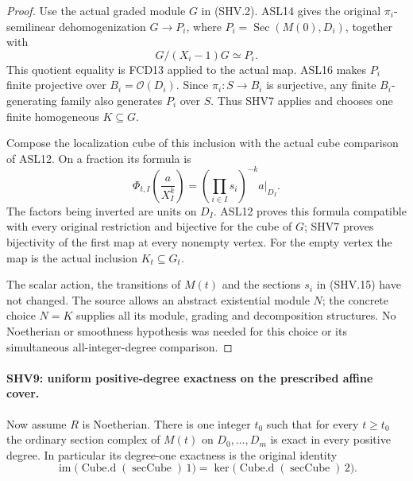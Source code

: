 \begin{proof}
Use the actual graded module $G$ in (SHV.2).
ASL14 gives the original $\pi_i$-semilinear dehomogenization
$G\to P_i$, where
$P_i=\operatorname{Sec}(M(0),D_i)$, together with
\[
                  G/(X_i-1)G\simeq P_i.                 \tag{SHV.14}
\]
This quotient equality is FCD13 applied to the actual map.
ASL16 makes $P_i$ finite projective over
$B_i=\mathcal O(D_i)$.  Since $\pi_i:S\to B_i$ is surjective,
any finite $B_i$-generating family also generates $P_i$ over $S$.
Thus SHV7 applies and chooses one finite homogeneous
$K\subseteq G$.

Compose the localization cube of this inclusion with the
actual cube comparison of ASL12.  On a fraction its formula is
\[
       \Phi_{t,I}\left(\frac{a}{X_I^k}\right)
              =\left(\prod_{i\in I}s_i\right)^{-k}a|_{D_I}.
                                                        \tag{SHV.15}
\]
The factors being inverted are units on $D_I$.  ASL12 proves
this formula compatible with every original restriction and
bijective for the cube of $G$; SHV7 proves bijectivity of the
first map at every nonempty vertex.  For the empty vertex the
map is the actual inclusion $K_t\subseteq G_t$.

The scalar action, the transitions of $M(t)$ and the sections
$s_i$ in (SHV.15) have not changed.  The source allows an
abstract existential module $N$; the concrete choice $N=K$
supplies all its module, grading and decomposition structures.
No Noetherian or smoothness hypothesis was needed for this
choice or its simultaneous all-integer-degree comparison.
\end{proof}

\paragraph{SHV9: uniform positive-degree exactness on the prescribed affine cover.}
\label{claim:SHV9}
Now assume $R$ is Noetherian.  There is one integer $t_0$ such
that for every $t\ge t_0$ the ordinary section complex of
$M(t)$ on $D_0,\ldots,D_m$ is exact in every positive degree.
In particular its degree-one exactness is the original identity
\[
 \operatorname{im}\bigl(\operatorname{Cube.d}(\operatorname{secCube})\,1\bigr)
 =\ker\bigl(\operatorname{Cube.d}(\operatorname{secCube})\,2\bigr).
                                                        \tag{SHV.16}
\]

